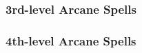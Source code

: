 \subsubsection{3rd-level Arcane Spells} 
\begin{swspelllist}

    \SLdimensionalanchor[Abjur]
    \SLdispelmagic
    \SLprotectionfromenergy
    \SLdeflection*

    \SLdimensionalanchor[Conj]
    \SLsummonmonsteriii
    \SLweb
    \SLdimensionslide*

    \SLlocateobjectgreater[Div]
    \SLreadmind
    \SLunlivingeyes
    \SLmomentofpresciencelesser*

    \SLconfusion[Ench]
    \SLcrushingdespair
    \SLheroism
    \SLhypnoticpattern
    \SLaversion*

    \SLfireball[Evoc]
    \SLlifeseekingmissile
    \SLlightningbolt
    \SLlevitate
    \SLtelekineticmaneuver*

    \SLhypnoticpattern[Illus]
    \SLinvisibility
    \SLminorimage*

    \SLinflictseriouswounds[Necro]
    \SLlifeseekingmissile
    \SLunlivingeyes
    \SLlinkvitality*

    \SLgaseousform[Trans]
    \SLshrinkitem
    \spellhead*{}

    \SLprismaticbeam[Univ]
\end{swspelllist}

\subsubsection{4th-level Arcane Spells} 
\begin{swspelllist}

    \SLdismissal[Abjur]
    \spellhead{}
    \SLretributiveshield
    \SLspellresistance*

    \SLblink[Conj]
    \SLdismissal
    \SLicestorm
    \SLsummonmonsteriv
    \SLdimensiondoor*

    \SLdiscernvulnerability[Div]
    \SLlocatecreature
    \SLmomentofprescience
    \SLprecognition*

    \SLholdmonster[Ench]
    \SLphantasmalkiller
    \SLsleep
    \SLsuggestion*

    \SLicestorm[Evoc]
    \SLshout
    \SLwalloffire
    \SLtelekineticforce*

    \SLdisplacement[Illus]
    \SLphantasmalkiller
    \SLmajorimage*

    \SLenervation[Necro]
    \SLinflictcriticalwounds
    \SLretributiveshield
    \SLbestowcurse*

    \SLfly[Trans]
    \SLinvestmagic
    \SLstoneskin
    \SLhaste*
\end{swspelllist}

